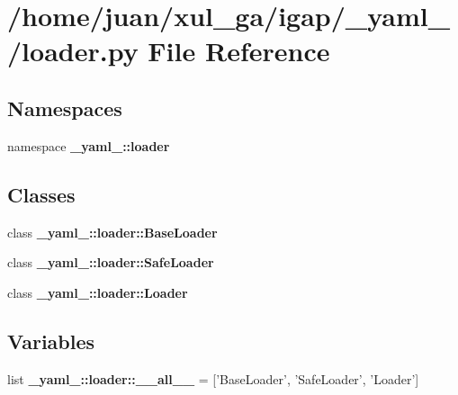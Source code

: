 \section{/home/juan/xul\_\-ga/igap/\_\-yaml\_\-/loader.py File Reference}
\label{loader_8py}
\subsection*{Namespaces}
\begin{CompactItemize}
\item 
namespace {\bf \_\-yaml\_\-::loader}
\end{CompactItemize}
\subsection*{Classes}
\begin{CompactItemize}
\item 
class {\bf \_\-yaml\_\-::loader::BaseLoader}
\item 
class {\bf \_\-yaml\_\-::loader::SafeLoader}
\item 
class {\bf \_\-yaml\_\-::loader::Loader}
\end{CompactItemize}
\subsection*{Variables}
\begin{CompactItemize}
\item 
list {\bf \_\-yaml\_\-::loader::\_\-\_\-all\_\-\_\-} = ['BaseLoader', 'SafeLoader', 'Loader']
\end{CompactItemize}
